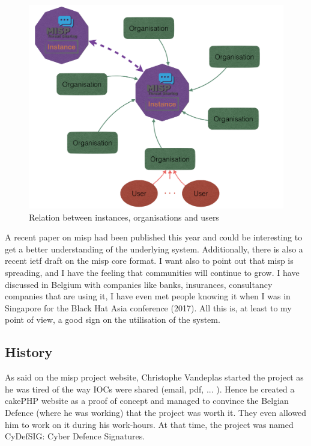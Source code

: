 \documentclass{eplmastersthesis}
\begin{document}
\begin{figure}
\centering
\includegraphics[scale=0.4]{res/misp-organisations}
\caption{Relation between instances, organisations and users}
\label{misp-organisations}
\end{figure}

A recent paper on \gls{misp} \cite{wagner2016misp} had been published this year and could be interesting to get a better understanding of the underlying system. Additionally, there is also a recent \gls{ietf} draft on the \gls{misp} core format\cite{MispDraft}.
I want also to point out that \gls{misp} is spreading, and I have the feeling that communities will continue to grow. I have discussed in Belgium with companies like banks, insurances, consultancy companies that are using it, I have even met people knowing it when I was in Singapore for the Black Hat Asia conference (2017). All this is, at least to my point of view, a good sign on the utilisation of the system.

\subsection{History}
As said on the \gls{misp} project website, Christophe Vandeplas started the project as he was tired of the way IOCs were shared (email, pdf, ... ). Hence he created a cakePHP website as a proof of concept and managed to convince the Belgian Defence (where he was working) that the project was worth it. They even allowed him to work on it during his work-hours. At that time, the project was named CyDefSIG: Cyber Defence Signatures.\\
\end{document}
